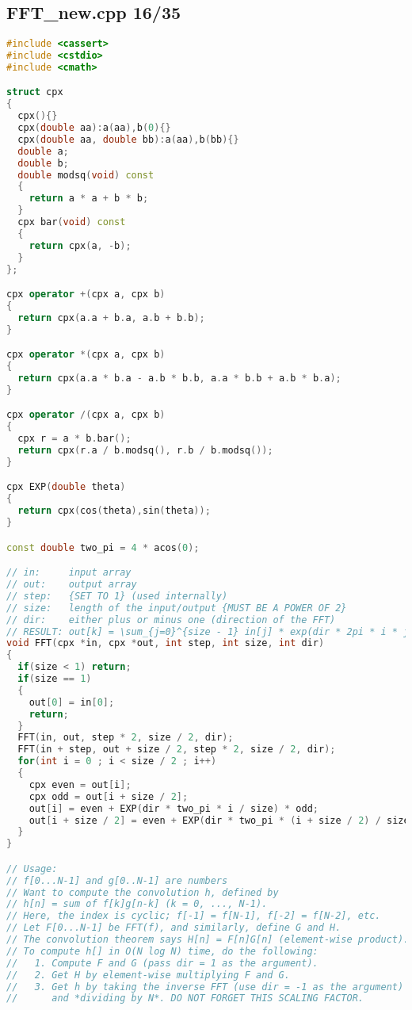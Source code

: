 \subsection{FFT\_new.cpp 16/35}
\begin{lstlisting}[language=C++]
#include <cassert>
#include <cstdio>
#include <cmath>

struct cpx
{
  cpx(){}
  cpx(double aa):a(aa),b(0){}
  cpx(double aa, double bb):a(aa),b(bb){}
  double a;
  double b;
  double modsq(void) const
  {
    return a * a + b * b;
  }
  cpx bar(void) const
  {
    return cpx(a, -b);
  }
};

cpx operator +(cpx a, cpx b)
{
  return cpx(a.a + b.a, a.b + b.b);
}

cpx operator *(cpx a, cpx b)
{
  return cpx(a.a * b.a - a.b * b.b, a.a * b.b + a.b * b.a);
}

cpx operator /(cpx a, cpx b)
{
  cpx r = a * b.bar();
  return cpx(r.a / b.modsq(), r.b / b.modsq());
}

cpx EXP(double theta)
{
  return cpx(cos(theta),sin(theta));
}

const double two_pi = 4 * acos(0);

// in:     input array
// out:    output array
// step:   {SET TO 1} (used internally)
// size:   length of the input/output {MUST BE A POWER OF 2}
// dir:    either plus or minus one (direction of the FFT)
// RESULT: out[k] = \sum_{j=0}^{size - 1} in[j] * exp(dir * 2pi * i * j * k / size)
void FFT(cpx *in, cpx *out, int step, int size, int dir)
{
  if(size < 1) return;
  if(size == 1)
  {
    out[0] = in[0];
    return;
  }
  FFT(in, out, step * 2, size / 2, dir);
  FFT(in + step, out + size / 2, step * 2, size / 2, dir);
  for(int i = 0 ; i < size / 2 ; i++)
  {
    cpx even = out[i];
    cpx odd = out[i + size / 2];
    out[i] = even + EXP(dir * two_pi * i / size) * odd;
    out[i + size / 2] = even + EXP(dir * two_pi * (i + size / 2) / size) * odd;
  }
}

// Usage:
// f[0...N-1] and g[0..N-1] are numbers
// Want to compute the convolution h, defined by
// h[n] = sum of f[k]g[n-k] (k = 0, ..., N-1).
// Here, the index is cyclic; f[-1] = f[N-1], f[-2] = f[N-2], etc.
// Let F[0...N-1] be FFT(f), and similarly, define G and H.
// The convolution theorem says H[n] = F[n]G[n] (element-wise product).
// To compute h[] in O(N log N) time, do the following:
//   1. Compute F and G (pass dir = 1 as the argument).
//   2. Get H by element-wise multiplying F and G.
//   3. Get h by taking the inverse FFT (use dir = -1 as the argument)
//      and *dividing by N*. DO NOT FORGET THIS SCALING FACTOR.


\end{lstlisting}
